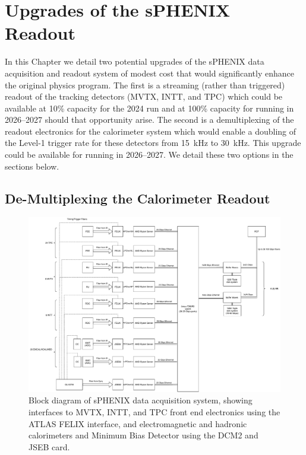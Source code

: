 \chapter{Upgrades of the sPHENIX Readout}
\label{chap:readout}

In this Chapter we detail two potential upgrades of the sPHENIX data
acquisition and readout system of modest cost that would significantly
enhance the original physics program.  The first is a streaming
(rather than triggered) readout of the tracking detectors (MVTX, INTT,
and TPC) which could be available at 10\% capacity for the 2024 run
and at 100\% capacity for running in 2026--2027 should that
opportunity arise.  The second is a demultiplexing of the readout
electronics for the calorimeter system which would enable a doubling
of the Level-1 trigger rate for these detectors from 15~kHz to 30~kHz.
This upgrade could be available for running in 2026--2027.  We detail
these two options in the sections below.



\section{De-Multiplexing the Calorimeter Readout}
\label{sec:streaming_readout}

\begin{figure}
    \centering
    \includegraphics[width=0.85\linewidth]{figs/sphenixdaq_servers_20200803.pdf}
    \caption{Block diagram of sPHENIX data acquisition system, showing
      interfaces to MVTX, INTT, and TPC front end electronics using
      the ATLAS FELIX interface, and electromagnetic and hadronic
      calorimeters and Minimum Bias Detector using the DCM2 and JSEB
      card.} 
    \label{fig:sphenixdaq_servers}
\end{figure}

